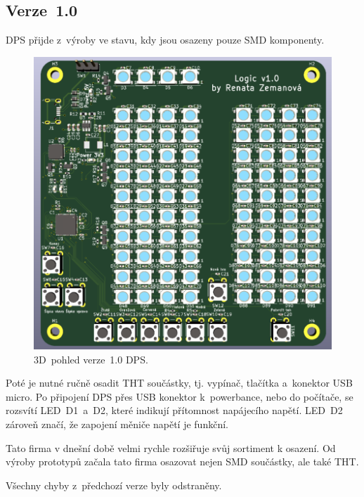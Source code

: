   \subsection{Verze~1.0}
  DPS přijde z~výroby ve stavu, kdy jsou osazeny pouze SMD komponenty. 

  \begin{figure}[!h]
    \begin{center}
      \includegraphics[scale=0.65]{obrazky/Verze1_3D_pohled.png}
    \end{center}
    \caption[3D~pohled verze~1.0 DPS]{3D~pohled verze~1.0 DPS.}
  \end{figure}

  Poté je nutné ručně osadit THT součástky, tj. vypínač, tlačítka a~konektor USB micro. Po připojení DPS přes USB konektor k~powerbance, 
  nebo do počítače, se rozsvítí LED~D1~a~D2, které indikují přítomnost napájecího napětí. LED~D2 zároveň značí, že zapojení měniče
  napětí je funkční.

  Tato firma v dnešní době 
  velmi rychle rozšiřuje svůj sortiment k osazení. Od výroby prototypů začala tato firma osazovat nejen SMD součástky, ale také THT.

  Všechny chyby z~předchozí verze byly odstraněny.

  

 
  




